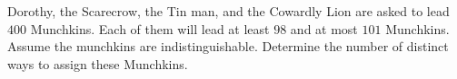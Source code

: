 Dorothy, the Scarecrow, the Tin man, and the Cowardly Lion are asked to lead $400$ Munchkins. Each of them will lead at least $98$ and at most $101$ Munchkins. Assume the munchkins are indistinguishable. Determine the number of distinct ways to assign these Munchkins.
